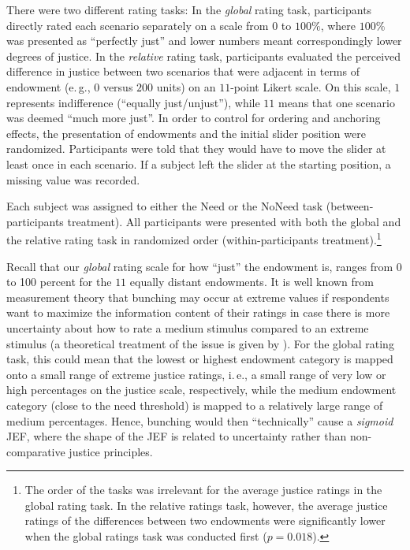 \documentclass[12pt]{scrartcl}
\begin{document}
There were two different rating tasks: In the \textit{global} rating task, participants directly rated each scenario separately on a scale from $0$ to $100\%$, where $100\%$ was presented as ``perfectly just'' and lower numbers meant correspondingly lower degrees of justice.
In the \textit{relative} rating task, participants evaluated the perceived difference in justice between two scenarios that were adjacent in terms of endowment (e.\,g., $0$ versus $200$ units) on an $11$-point Likert scale.
On this scale, $1$ represents indifference (``equally just/unjust''), while $11$ means that one scenario was deemed ``much more just''.
In order to control for ordering and anchoring effects, the presentation of endowments and the initial slider position were randomized.
Participants were told that they would have to move the slider at least once in each scenario.
If a subject left the slider at the starting position, a missing value was recorded.

Each subject was assigned to either the Need or the NoNeed task (between-participants treatment).
All participants were presented with both the global and the relative rating task in randomized order (within-participants treatment).\footnote{The order of the tasks was irrelevant for the average justice ratings in the global rating task. In the relative ratings task, however, the average justice ratings of the differences between two endowments were significantly lower when the global ratings task was conducted first ($p=0.018$).}

Recall that our \textit{global} rating scale for how ``just'' the endowment is, ranges from 0 to 100 percent for the $11$ equally distant endowments.
It is well known from measurement theory that bunching may occur at extreme values \citep[e.\,g.,][]{mickes_strong_2011} if respondents want to maximize the information content of their ratings in case there is more uncertainty about how to rate a medium stimulus compared to an extreme stimulus (a theoretical treatment of the issue is given by \citealt[p.~1652ff.]{seidl_how_1994}).
For the global rating task, this could mean that the lowest or highest endowment category is mapped onto a small range of extreme justice ratings, i.\,e., a small range of very low or high percentages on the justice scale, respectively, while the medium endowment category (close to the need threshold) is mapped to a relatively large range of medium percentages.
Hence, bunching would then ``technically'' cause a \textit{sigmoid} JEF, where the shape of the JEF is related to uncertainty rather than non-comparative justice principles.
\end{document}
